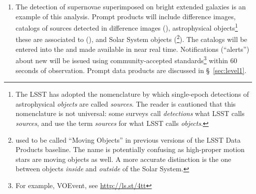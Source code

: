\documentclass[SE,lsstdraft,toc]{lsstdoc}
\begin{document}
\begin{enumerate}
    \item {} The detection of supernovae superimposed on bright extended galaxies is an example of this analysis.  Prompt products will include difference images, catalogs of sources detected in difference images (\DIASources), astrophysical objects\footnote{The LSST has adopted the nomenclature by which single-epoch detections of astrophysical \emph{objects} are called \emph{sources}. The reader is cautioned that this nomenclature is not universal: some surveys call \emph{detections} what LSST calls \emph{sources}, and use the term \emph{sources} for what LSST calls \emph{objects}.} these are associated to (\DIAObjects), and Solar System objects (\SSObjects\footnote{\SSObjects used to be called ``Moving Objects'' in previous versions of the LSST Data Products baseline. The name is potentially confusing as high-proper motion stars are moving objects as well. A more accurate distinction is the one between objects \emph{inside} and \emph{outside} of the Solar System.}). The catalogs will be entered into the \textbf{\PPDB} and made available in near real time. Notifications (``alerts'') about new \DIASources will be issued using community-accepted
standards\footnote{For example, VOEvent, see \url{http://ls.st/4tt}} within 60 seconds of observation. Prompt data products are discussed in \S~\ref{sec:level1}.


\end{enumerate}
\end{document}
